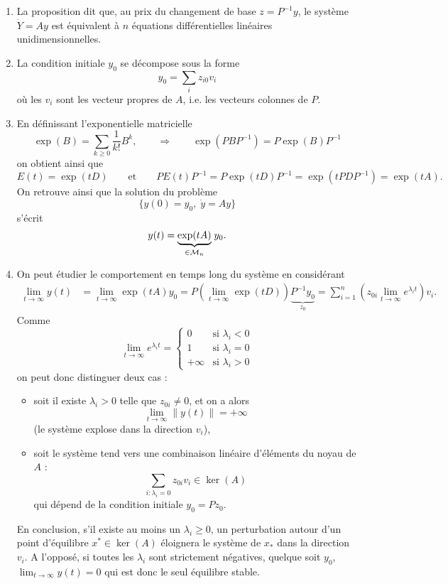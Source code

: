 \remarks
\begin{enumerate}
  \item La proposition dit que, au prix du changement de base $z = P^{-1} y$, le système $\dot Y = A y$ est équivalent à $n$ équations différentielles linéaires unidimensionnelles.
  \item La condition initiale $y_0$ se décompose sous la forme
  $$
  y_0 = \sum_i z_{i0} v_i
  $$
  où les $v_i$ sont les vecteur propres de $A$, i.e. les vecteurs colonnes de $P$.
  \item En définissant l'exponentielle matricielle
  $$
  \exp(B) = \sum_{k \geq 0} \frac1{k!} B^k,
  \qquad \Rightarrow \qquad
  \exp(P B P^{-1}) = P \exp(B) P^{-1}
  $$
  on obtient ainsi que
  $$
  E(t) = \exp(t D) 
  \qquad \text{et} \qquad 
  P E(t) P^{-1} = P \exp(t D) P^{-1} = \exp(t P D P^{-1}) = \exp(t A).
  $$
  On retrouve ainsi que la solution du problème
  $$
  \{y(0) = y_0, \; \dot y = A y\}
  $$
  s'écrit
  $$
  y(t) = \underset{\in \mathcal{M}_n}{\underbrace{\exp(t A)}} \; y_0.
  $$
  \item On peut étudier le comportement en temps long du système en considérant
  \begin{align*}
    \lim_{t \rightarrow \infty} y(t)
    & = \lim_{t \rightarrow \infty} \exp(t A) y_0 
    = P \left(\lim_{t \rightarrow \infty} \exp(t D)\right) \underset{z_0}{\underbrace{P^{-1} y_0}}
    = \sum_{i=1}^n \left(z_{0i} \lim_{t \rightarrow \infty} e^{\lambda_i t}\right) v_i.
  \end{align*}
  Comme
  $$
  \lim_{t \rightarrow \infty} e^{\lambda_i t} = 
  \left\{\begin{array}{rr}
          0 & \text{si } \lambda_i < 0 \\
          1 & \text{si } \lambda_i = 0 \\
          +\infty & \text{si } \lambda_i > 0
         \end{array}\right.
  $$
  on peut donc distinguer deux cas : 
  \begin{itemize}
  \item soit il existe $\lambda_i > 0$ telle que $z_{0i} \neq 0$, et on a alors
  $$
  \lim_{t \rightarrow \infty} \|y(t)\| = + \infty
  $$
  (le système explose dans la direction $v_i$), 
  \item soit le système tend vers une combinaison linéaire d'éléments du noyau de $A$ :
  $$
  \sum_{i : \lambda_i = 0} z_{0i} v_i \in \ker(A)
  $$
  qui dépend de la condition initiale $y_0 = P z_0$.
  \end{itemize}
  En conclusion, s'il existe au moins un $\lambda_i \geq 0$, un perturbation autour d'un point d'équilibre $x^* \in \ker(A)$ éloignera le système de $x_ *$ dans la direction $v_i$. A l'opposé, si toutes les $\lambda_i$ sont strictement négatives, quelque soit $y_0$, $\lim_{t \rightarrow \infty} y(t) = 0$ qui est donc le seul équilibre stable.
\end{enumerate}


